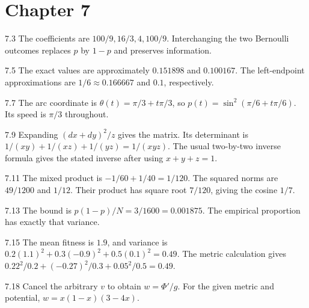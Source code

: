 \documentclass[11pt,oneside,openany]{book}
\theoremstyle{definition}
\theoremstyle{remark}
\newenvironment{answers}{\begin{description}[leftmargin=2.9em,labelwidth=2.5em,labelsep=.4em,itemsep=8pt,font=\normalfont\bfseries]}{\end{description}}
\numberwithin{equation}{chapter}
\begin{document}
\section*{Chapter 7}
\begin{answers}
\item[7.3] The coefficients are $100/9,16/3,4,100/9$. Interchanging the two Bernoulli outcomes replaces $p$ by $1-p$ and preserves information.
\item[7.5] The exact values are approximately $0.151898$ and $0.100167$. The left-endpoint approximations are $1/6\approx0.166667$ and $0.1$, respectively.
\item[7.7] The arc coordinate is $\theta(t)=\pi/3+t\pi/3$, so $p(t)=\sin^2(\pi/6+t\pi/6)$. Its speed is $\pi/3$ throughout.
\item[7.9] Expanding $(dx+dy)^2/z$ gives the matrix. Its determinant is $1/(xy)+1/(xz)+1/(yz)=1/(xyz)$. The usual two-by-two inverse formula gives the stated inverse after using $x+y+z=1$.
\item[7.11] The mixed product is $-1/60+1/40=1/120$. The squared norms are $49/1200$ and $1/12$. Their product has square root $7/120$, giving the cosine $1/7$.
\item[7.13] The bound is $p(1-p)/N=3/1600=0.001875$. The empirical proportion has exactly that variance.
\item[7.15] The mean fitness is $1.9$, and variance is $0.2(1.1)^2+0.3(-0.9)^2+0.5(0.1)^2=0.49$. The metric calculation gives $0.22^2/0.2+(-0.27)^2/0.3+0.05^2/0.5=0.49$.
\item[7.18] Cancel the arbitrary $v$ to obtain $w=\Phi'/g$. For the given metric and potential, $w=x(1-x)(3-4x)$.
\end{answers}
\end{document}
